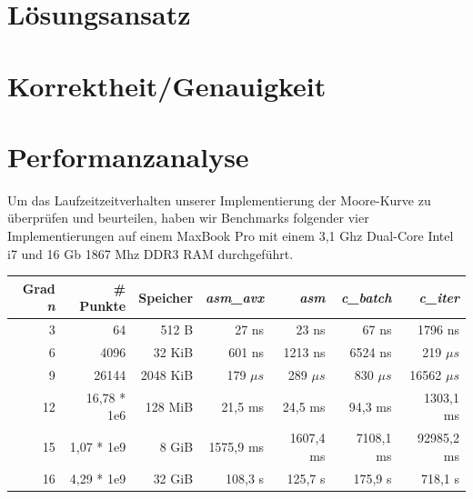 \documentclass[course=erap]{aspdoc}
\begin{document}




\section{Lösungsansatz}


\section{Korrektheit/Genauigkeit}


\section{Performanzanalyse}
Um das Laufzeitzeitverhalten unserer Implementierung der Moore-Kurve zu überprüfen und beurteilen, haben wir Benchmarks folgender vier Implementierungen auf einem MaxBook Pro mit einem 3,1 Ghz Dual-Core Intel i7 und 16 Gb 1867 Mhz DDR3 RAM durchgeführt.

\begin{center}
    \begin{tabular}{| r | r | r | r | r | r | r |}
    \hline
    Grad \textit{n} & \# Punkte & Speicher & \textit{asm\_avx} & \textit{asm} & \textit{c\_batch} & \textit{c\_iter}  \\ \hline
    3 & 64 & 512 B  & 27 ns & 23 ns & 67 ns & 1796 ns \\  \hline
    6 & 4096 & 32 KiB  & 601 ns & 1213 ns & 6524 ns & 219 $\mu s$ \\  \hline
    9 & 26144 & 2048 KiB  & 179 $\mu s$ & 289 $\mu s$ & 830 $\mu s$ & 16562 $\mu s$  \\  \hline
    12 & 16,78 * 1e6 & 128 MiB & 21,5 ms & 24,5 ms & 94,3 ms & 1303,1 ms \\ \hline
    15 & 1,07 * 1e9 & 8 GiB & 1575,9 ms & 1607,4 ms & 7108,1 ms & 92985,2 ms \\ \hline
    16 & 4,29 * 1e9 & 32 GiB & 108,3 s & 125,7 s & 175,9 s & 718,1 s \\ \hline
    \end{tabular}
\end{center}
\end{document}
